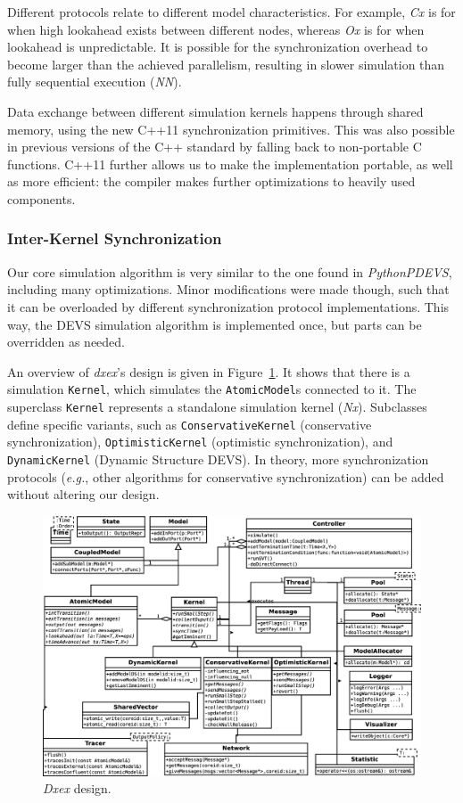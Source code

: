 Different protocols relate to different model characteristics.
For example, \textit{Cx} is for when high lookahead exists between different nodes, whereas \textit{Ox} is for when lookahead is unpredictable.
It is possible for the synchronization overhead to become larger than the achieved parallelism, resulting in slower simulation than fully sequential execution (\textit{NN}).

Data exchange between different simulation kernels happens through shared memory, using the new C++11 synchronization primitives.
This was also possible in previous versions of the C++ standard by falling back to non-portable C functions.
C++11 further allows us to make the implementation portable, as well as more efficient: the compiler makes further optimizations to heavily used components.

\subsubsection{Inter-Kernel Synchronization}
Our core simulation algorithm is very similar to the one found in \textit{PythonPDEVS}, including many optimizations.
Minor modifications were made though, such that it can be overloaded by different synchronization protocol implementations.
This way, the \textsf{DEVS} simulation algorithm is implemented once, but parts can be overridden as needed.

An overview of \textit{dxex}'s design is given in Figure~\ref{fig:class_diagram}.
It shows that there is a simulation \texttt{Kernel}, which simulates the \texttt{AtomicModel}s connected to it.
The superclass \texttt{Kernel} represents a standalone simulation kernel (\textit{Nx}).
Subclasses define specific variants, such as \texttt{ConservativeKernel} (conservative synchronization), \texttt{OptimisticKernel} (optimistic synchronization), and \texttt{DynamicKernel} (\textsf{Dynamic Structure DEVS}).
In theory, more synchronization protocols (\textit{e.g.}, other algorithms for conservative synchronization) can be added without altering our design.

\begin{figure}
    \includegraphics[width=\textwidth]{fig/cores_class_diagram.eps}
	\caption{\textit{Dxex} design.}
	\label{fig:class_diagram}
\end{figure}

